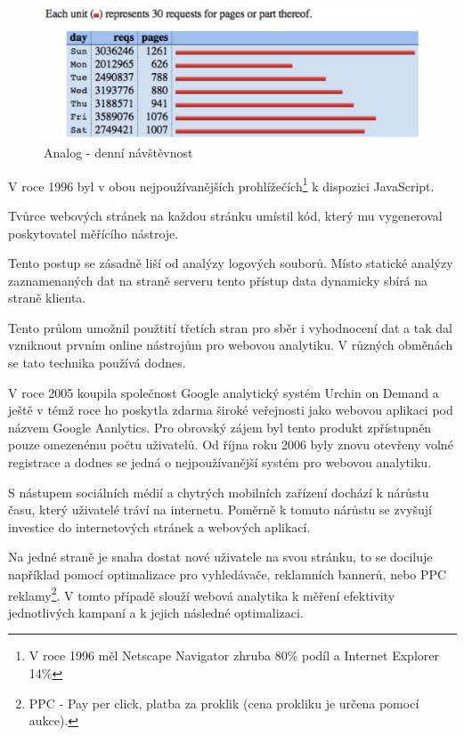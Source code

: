\documentclass[bc,female,java,dept456]{diploma}						%
\begin{document}
\begin{figure}[h]
	\centering
	\includegraphics[width=14cm]{img/analog_daily.pdf}
	\caption{Analog - denní návštěvnost}
	\label{analog_daily}
\end{figure}


V roce 1996 byl v obou nejpoužívanějších prohlížečích\footnote{V roce 1996 měl Netscape Navigator zhruba 80\% podíl a Internet Explorer 14\%} k dispozici JavaScript. 

Tvůrce webových stránek na každou stránku umístil kód, který mu vygeneroval poskytovatel měřícího nástroje. 


Tento postup se zásadně liší od analýzy logových souborů. Místo statické analýzy zaznamenaných dat na straně serveru tento přístup data dynamicky sbírá na straně klienta.

Tento průlom umožnil použtití třetích stran pro sběr i vyhodnocení dat a tak dal vzniknout prvním online nástrojům pro webovou analytiku. V různých obměnách se tato technika používá dodnes.

V roce 2005 koupila společnost Google analytický systém Urchin on Demand a ještě v témž roce ho poskytla zdarma široké veřejnosti jako webovou aplikaci pod názvem Google Aanlytics. Pro obrovský zájem byl tento produkt zpřístupněn pouze omezenému počtu uživatelů. Od října roku 2006 byly znovu otevřeny volné registrace a dodnes se jedná o nejpoužívanější systém pro webovou analytiku.

\bigskip

S nástupem sociálních médií a chytrých mobilních zařízení dochází k nárůstu času, který uživatelé tráví na internetu. Poměrně k tomuto nárůstu se zvyšují investice do internetových stránek a webových aplikací. 

Na jedné straně je snaha dostat nové uživatele na svou stránku, to se dociluje například pomocí optimalizace pro vyhledávače, reklamních bannerů, nebo PPC reklamy\footnote{PPC - Pay per click, platba za proklik (cena prokliku je určena pomocí aukce).}. V tomto případě slouží webová analytika k měření efektivity jednotlivých kampaní a k jejich následné optimalizaci.
\end{document}

